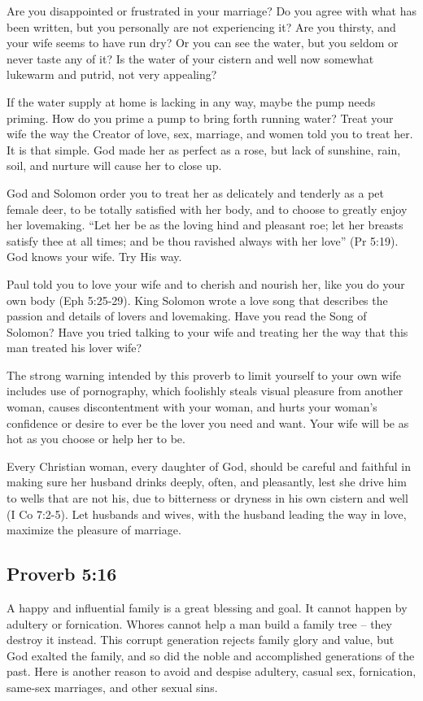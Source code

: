 Are you disappointed or frustrated in your marriage? Do you agree with what has been written, but you personally are not experiencing it? Are you thirsty, and your wife seems to have run dry? Or you can see the water, but you seldom or never taste any of it? Is the water of your cistern and well now somewhat lukewarm and putrid, not very appealing?

If the water supply at home is lacking in any way, maybe the pump needs priming. How do you prime a pump to bring forth running water? Treat your wife the way the Creator of love, sex, marriage, and women told you to treat her. It is that simple. God made her as perfect as a rose, but lack of sunshine, rain, soil, and nurture will cause her to close up.

God and Solomon order you to treat her as delicately and tenderly as a pet female deer, to be totally satisfied with her body, and to choose to greatly enjoy her lovemaking. “Let her be as the loving hind and pleasant roe; let her breasts satisfy thee at all times; and be thou ravished always with her love” (Pr 5:19). God knows your wife. Try His way.

Paul told you to love your wife and to cherish and nourish her, like you do your own body (Eph 5:25-29). King Solomon wrote a love song that describes the passion and details of lovers and lovemaking. Have you read the Song of Solomon? Have you tried talking to your wife and treating her the way that this man treated his lover wife?

The strong warning intended by this proverb to limit yourself to your own wife includes use of pornography, which foolishly steals visual pleasure from another woman, causes discontentment with your woman, and hurts your woman’s confidence or desire to ever be the lover you need and want. Your wife will be as hot as you choose or help her to be.

Every Christian woman, every daughter of God, should be careful and faithful in making sure her husband drinks deeply, often, and pleasantly, lest she drive him to wells that are not his, due to bitterness or dryness in his own cistern and well (I Co 7:2-5). Let husbands and wives, with the husband leading the way in love, maximize the pleasure of marriage.

\subsection{Proverb 5:16}
A happy and influential family is a great blessing and goal. It cannot happen by adultery or fornication. Whores cannot help a man build a family tree – they destroy it instead. This corrupt generation rejects family glory and value, but God exalted the family, and so did the noble and accomplished generations of the past. Here is another reason to avoid and despise adultery, casual sex, fornication, same-sex marriages, and other sexual sins.

